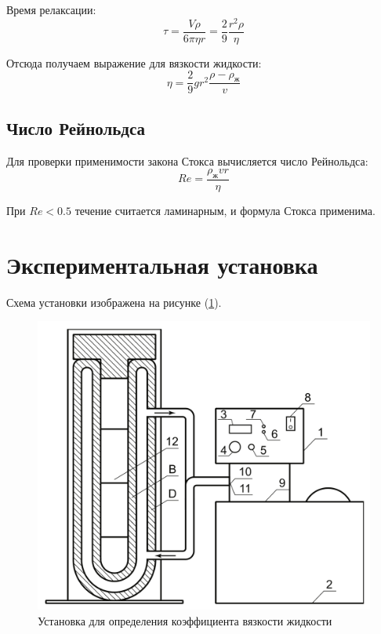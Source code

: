 \documentclass[a4paper,12pt]{article} %
\begin{document}
Время релаксации:
\begin{equation}
	\tau = \frac{V \rho}{6 \pi \eta r} = \frac{2}{9} \frac{r^2 \rho}{\eta}
	\label{tau}
\end{equation}

Отсюда получаем выражение для вязкости жидкости:
\begin{equation}
    \eta = \frac{2}{9} g r^2 \frac{\rho - \rho_\text{ж}}{v}
		\label{eta}
\end{equation}
 
\subsection*{Число Рейнольдса}
Для проверки применимости закона Стокса вычисляется число Рейнольдса:
\begin{equation}
    Re = \frac{\rho_\text{ж} v r}{\eta}
		\label{Re}
\end{equation}

При $Re < 0.5$ течение считается ламинарным, и формула Стокса применима.

\section*{Экспериментальная установка}

Схема установки изображена на рисунке (\ref{fig:setup}). 

\begin{figure}[h!]
	\centering
	\includegraphics[scale = 0.3]{setup.png}
	\caption{Установка для определения коэффициента вязкости жидкости}
	\label{fig:setup}
\end{figure}
\end{document}
